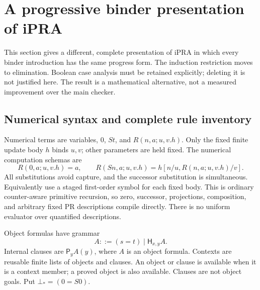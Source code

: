 \section{A progressive binder presentation of iPRA}
\label{app:progressive-binder}

This section gives a different, complete presentation of iPRA in which
every binder introduction has the same progress form.  The induction
restriction moves to elimination.  Boolean case analysis must be
retained explicitly; deleting it is not justified here.  The result is a
mathematical alternative, not a measured improvement over the main
checker.

\subsection{Numerical syntax and complete rule inventory}

Numerical terms are variables, $0$, $St$, and
$R(n,a;u,v.h)$.  Only the fixed finite update body $h$ binds $u,v$;
other parameters are held fixed.  The numerical computation schemas are
\[
 R(0,a;u,v.h)=a,\qquad
 R(Sn,a;u,v.h)=h[n/u,R(n,a;u,v.h)/v].
 \tag{PR}
\]
All substitutions avoid capture, and the successor substitution is
simultaneous.  Equivalently use a staged first-order symbol for each
fixed body.  This is ordinary counter-aware primitive recursion, so
zero, successor, projections, composition, and arbitrary fixed PR
descriptions compile directly.  There is no uniform evaluator over
quantified descriptions.

Object formulas have grammar
\[
 A::=(s=t)\mid\mathsf H_{x,y}A.
\]
Internal clauses are $\mathsf P_yA(y)$, where $A$ is an object formula.
Contexts are reusable finite lists of objects and clauses.  An object
or clause is available when it is a context member; a proved object is
also available.  Clauses are not object goals.  Put $\bot_*=(0=S0)$.

